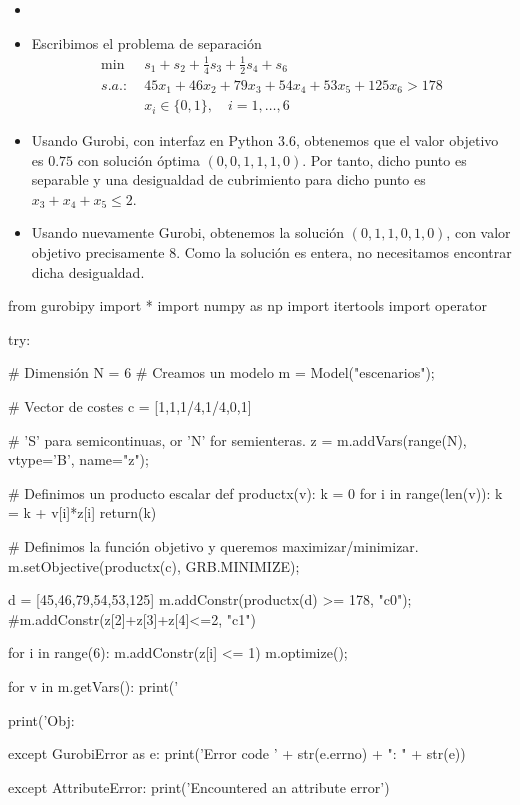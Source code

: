\documentclass[twoside]{article}
\newenvironment{solucion}{\begin{trivlist}
 \item[\hskip \labelsep {\textit{Solución}.}\hskip \labelsep]}{\end{trivlist}}
\begin{document}
\begin{solucion}
\begin{itemize}
\item[]
\item Escribimos el problema de separación
\begin{align*}
\min \;& s_1+s_2 + \frac{1}{4}s_3+\frac{1}{2}s_4+s_6\\
s.a.:\;& 45x_1 + 46x_2 + 79x_3 +54x_4 +53x_5+125x_6 > 178 \\
&x_i\in\{0,1\},\quad i=1,\dotsc,6
\end{align*}
\item Usando Gurobi, con interfaz en Python 3.6, obtenemos que el valor objetivo es $0.75$ con solución óptima $(0,0,1,1,1,0)$. Por tanto, dicho punto es separable y una desigualdad de cubrimiento para dicho punto es $x_3+x_4+x_5 \leq 2$. 
\item Usando nuevamente Gurobi, obtenemos la solución $(0,1,1,0,1,0)$, con valor objetivo precisamente $8$. Como la solución es entera, no necesitamos encontrar dicha desigualdad.
\end{itemize}
\newpage
\begin{pythone}
from gurobipy import *
import numpy as np
import itertools
import operator

try:

    # Dimensión
    N = 6
    # Creamos un modelo
    m = Model("escenarios");
    
    # Vector de costes
    c = [1,1,1/4,1/4,0,1]
    
    # 'S' para semicontinuas, or 'N' for semienteras.
    z = m.addVars(range(N), vtype='B', name="z");
    
    # Definimos un producto escalar 
    def productx(v):
        k = 0
        for i in range(len(v)):
            k = k + v[i]*z[i]
        return(k)    
                
    # Definimos la función objetivo y queremos maximizar/minimizar.
    m.setObjective(productx(c), GRB.MINIMIZE);
          
    d = [45,46,79,54,53,125]
    m.addConstr(productx(d) >= 178, "c0");
    #m.addConstr(z[2]+z[3]+z[4]<=2, "c1")
    
    for i in range(6):
        m.addConstr(z[i] <= 1)
    m.optimize();
        
    for v in m.getVars():
        print('%

    print('Obj: %

except GurobiError as e:
    print('Error code ' + str(e.errno) + ": " + str(e))

except AttributeError:
    print('Encountered an attribute error')
\end{pythone}

\end{solucion}
\end{document}
